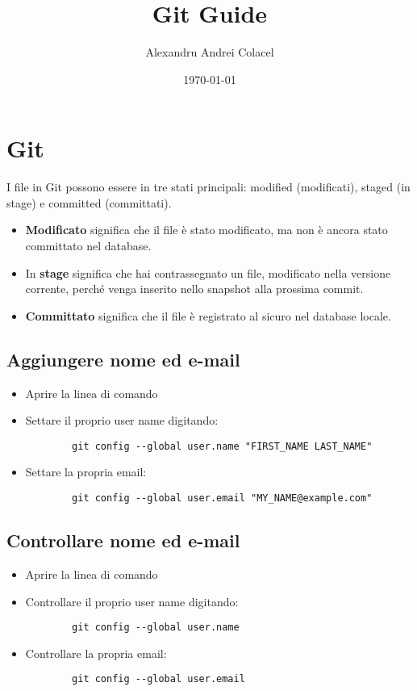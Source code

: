 \documentclass{article}
\title{Git Guide}
\author{Alexandru Andrei Colacel}
\date{\today}
\begin{document}
\maketitle


\section*{Git}
I file in Git possono essere in tre stati principali: modified (modificati), staged (in stage) e committed (committati).
\begin{itemize}
    \item \textbf{Modificato} significa che il file è stato modificato, ma non è ancora stato committato nel database. 
    \item In \textbf{stage} significa che hai contrassegnato un file, modificato nella versione corrente, perché venga inserito nello snapshot alla prossima commit. 
    \item \textbf{Committato} significa che il file è registrato al sicuro nel database locale.
\end{itemize} 

\subsection*{Aggiungere nome ed e-mail}
\begin{itemize}
    \item Aprire la linea di comando
    \item Settare il proprio user name digitando:
    \begin{verbatim}    
        git config --global user.name "FIRST_NAME LAST_NAME"
    \end{verbatim}
    \item Settare la propria email: 
    \begin{verbatim}
        git config --global user.email "MY_NAME@example.com"
    \end{verbatim}    
\end{itemize}

\subsection*{Controllare nome ed e-mail}
\begin{itemize}
    \item Aprire la linea di comando
    \item Controllare il proprio user name digitando:
    \begin{verbatim}    
        git config --global user.name
    \end{verbatim}
    \item Controllare la propria email: 
    \begin{verbatim}
        git config --global user.email
    \end{verbatim}    
\end{itemize}
\end{document}
